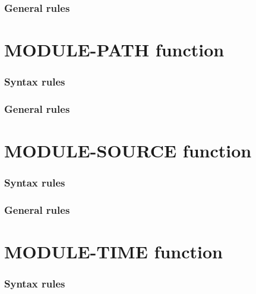 \subsubsection{General rules}

\section{MODULE-PATH function}

\begin{syntax}[\gnucobolcolour]
   
\end{syntax}

\subsubsection{Syntax rules}

\subsubsection{General rules}

\section{MODULE-SOURCE function}

\begin{syntax}[\gnucobolcolour]
   
\end{syntax}

\subsubsection{Syntax rules}

\subsubsection{General rules}

\section{MODULE-TIME function}

\begin{syntax}[\gnucobolcolour]
   
\end{syntax}

\subsubsection{Syntax rules}

